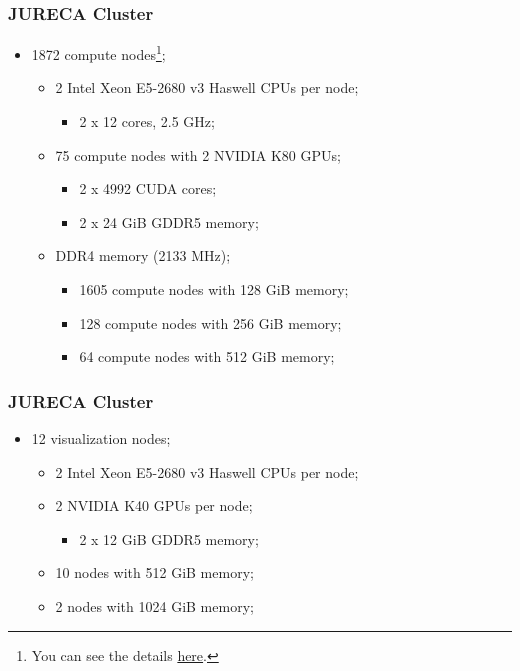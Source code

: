 \documentclass{beamer}
\begin{document}
\begin{frame}
  \frametitle{JURECA Cluster}
  \begin{itemize}
    \item 1872 compute nodes\footnote{You can see the details \href{https://www.fz-juelich.de/ias/jsc/EN/Expertise/Supercomputers/JURECA/Configuration/Configuration_node.html}{here}.};
          \begin{itemize}
            \item 2 Intel Xeon E5-2680 v3 Haswell CPUs per node;
                  \begin{itemize}
                    \item 2 x 12 cores, 2.5 GHz;
                  \end{itemize}
            \item 75 compute nodes with 2 NVIDIA K80 GPUs;
                  \begin{itemize}
                    \item 2 x 4992 CUDA cores;
                    \item 2 x 24 GiB GDDR5 memory;
                  \end{itemize}
            \item DDR4 memory (2133 MHz);
                  \begin{itemize}
                    \item 1605 compute nodes with 128 GiB memory;
                    \item 128 compute nodes with 256 GiB memory;
                    \item 64 compute nodes with 512 GiB memory;
                  \end{itemize}
          \end{itemize}
  \end{itemize}
\end{frame}

\begin{frame}
  \frametitle{JURECA Cluster}
  \begin{itemize}
    \item 12 visualization nodes;
          \begin{itemize}
            \item 2 Intel Xeon E5-2680 v3 Haswell CPUs per node;
            \item 2 NVIDIA K40 GPUs per node;
                  \begin{itemize}
                    \item 2 x 12 GiB GDDR5 memory;
                  \end{itemize}
            \item 10 nodes with 512 GiB memory;
            \item 2 nodes with 1024 GiB memory;
          \end{itemize}
  \end{itemize}
\end{frame}
\end{document}
